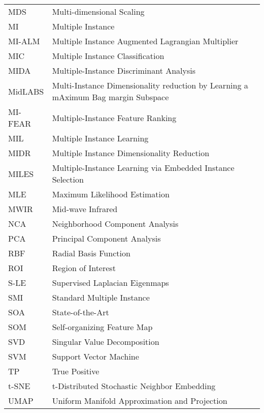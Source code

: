 \begin{longtable}{l p{5in}}
MDS & Multi-dimensional Scaling\\
MI & Multiple Instance\\
MI-ALM & Multiple Instance Augmented Lagrangian Multiplier\\
MIC & Multiple Instance Classification\\
MIDA & Multiple-Instance Discriminant Analysis\\
MidLABS & Multi-Instance Dimensionality reduction by Learning a mAximum Bag margin Subspace\\
MI-FEAR & Multiple-Instance Feature Ranking\\
MIL & Multiple Instance Learning\\
MIDR & Multiple Instance Dimensionality Reduction\\
MILES & Multiple-Instance Learning via Embedded Instance Selection\\
MLE & Maximum Likelihood Estimation\\
MWIR & Mid-wave Infrared\\
NCA & Neighborhood Component Analysis\\
PCA & Principal Component Analysis\\
RBF & Radial Basis Function\\
ROI & Region of Interest\\
S-LE & Supervised Laplacian Eigenmaps\\
SMI& Standard Multiple Instance\\
SOA & State-of-the-Art\\
SOM & Self-organizing Feature Map\\
SVD & Singular Value Decomposition\\
SVM & Support Vector Machine\\
TP & True Positive\\
t-SNE & t-Distributed Stochastic Neighbor Embedding\\
UMAP & Uniform Manifold Approximation and Projection\\

 \end{longtable}



\doublespacing

